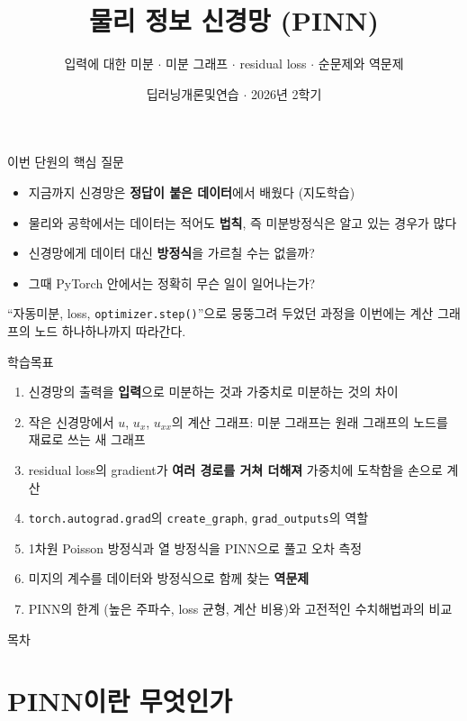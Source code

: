 \documentclass[aspectratio=169,11pt]{beamer}
\title{물리 정보 신경망 (PINN)}
\subtitle{입력에 대한 미분 $\cdot$ 미분 그래프 $\cdot$ residual loss $\cdot$ 순문제와 역문제}
\date{딥러닝개론및연습 $\cdot$ 2026년 2학기}
\begin{document}
\begin{frame}[plain]
\titlepage
\end{frame}

\begin{frame}{이번 단원의 핵심 질문}
\begin{keybox}[이번 단원의 핵심 질문]
\begin{itemize}
\item 지금까지 신경망은 \textbf{정답이 붙은 데이터}에서 배웠다 (지도학습)
\item 물리와 공학에서는 데이터는 적어도 \textbf{법칙}, 즉 미분방정식은 알고 있는 경우가 많다
\item 신경망에게 데이터 대신 \textbf{방정식}을 가르칠 수는 없을까?
\item 그때 PyTorch 안에서는 정확히 무슨 일이 일어나는가?
\end{itemize}
\end{keybox}
\vskip2mm
``자동미분, loss, \texttt{optimizer.step()}''으로 뭉뚱그려 두었던 과정을 이번에는 계산 그래프의 노드 하나하나까지 따라간다.
\end{frame}

\begin{frame}{학습목표}
\begin{enumerate}
\item 신경망의 출력을 \textbf{입력}으로 미분하는 것과 가중치로 미분하는 것의 차이
\item 작은 신경망에서 $u$, $u_x$, $u_{xx}$의 계산 그래프: 미분 그래프는 원래 그래프의 노드를 재료로 쓰는 새 그래프
\item residual loss의 gradient가 \textbf{여러 경로를 거쳐 더해져} 가중치에 도착함을 손으로 계산
\item \texttt{torch.autograd.grad}의 \texttt{create\_graph}, \texttt{grad\_outputs}의 역할
\item 1차원 Poisson 방정식과 열 방정식을 PINN으로 풀고 오차 측정
\item 미지의 계수를 데이터와 방정식으로 함께 찾는 \textbf{역문제}
\item PINN의 한계 (높은 주파수, loss 균형, 계산 비용)와 고전적인 수치해법과의 비교
\end{enumerate}
\end{frame}

\begin{frame}{목차}
\small
\tableofcontents
\end{frame}

\section{PINN이란 무엇인가}
\end{document}
